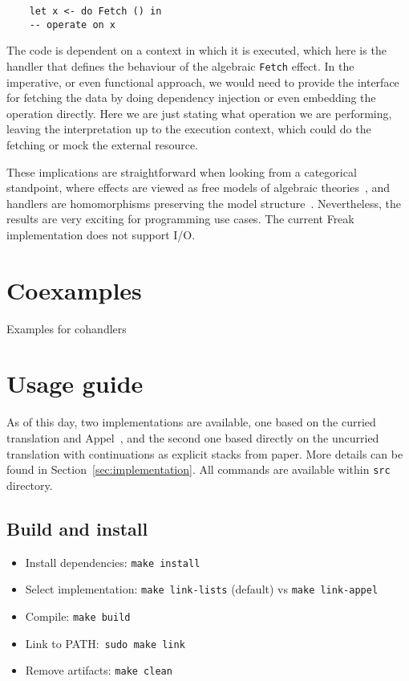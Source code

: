 \documentclass[declaration,shortabstract]{iithesis}
\theoremstyle{definition} \newtheorem{definition}{Definition}[chapter]
\theoremstyle{remark} \newtheorem{remark}[definition]{Observation}
\theoremstyle{plain} \newtheorem{theorem}[definition]{Theorem}
\theoremstyle{plain} \newtheorem{lemma}[definition]{Lemma}
\begin{document}
    \begin{verbatim}
    let x <- do Fetch () in
    -- operate on x
    \end{verbatim}

    The code is dependent on a context in which it is executed, which here is
    the handler that defines the behaviour of the algebraic \verb!Fetch! effect.
    In the imperative, or even functional approach, we would need to provide
    the interface for fetching the data by doing dependency injection or even
    embedding the operation directly. Here we are just stating what operation
    we are performing, leaving the interpretation up to the execution context,
    which could do the fetching or mock the external resource.

    These implications are straightforward when looking from a categorical standpoint,
    where effects are viewed as free models of algebraic theories~\cite{adequacy},
    and handlers are homomorphisms preserving the model structure~\cite{handlers}.
    Nevertheless, the results are very exciting for programming use cases. The current
    Freak implementation does not support I/O.

\section{Coexamples}

    Examples for cohandlers

\section{Usage guide}

    As of this day, two implementations are available, one based on the curried
    translation and Appel~\cite{appel-continuations}, and the second one based
    directly on the uncurried translation with continuations as explicit stacks
    from paper. More details can be found in Section~\ref{sec:implementation}.
    All commands are available within \verb!src!  directory.

    \subsection{Build and install}

    \begin{itemize}
        \item Install dependencies: \verb!make install!
        \item Select implementation: \verb!make link-lists! (default) vs \verb!make link-appel!
        \item Compile: \verb!make build!
        \item Link to PATH:~\verb!sudo make link!
        \item Remove artifacts: \verb!make clean!
    \end{itemize}
\end{document}
